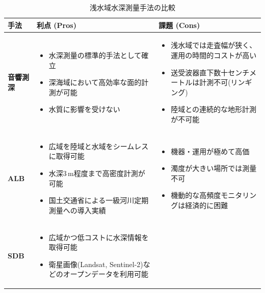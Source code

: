 \begin{table}[htbp]
  \centering
  \small
  \renewcommand{\arraystretch}{1.3}
  \caption{浅水域水深測量手法の比較}
  \label{tab:bathymetry-methods-comparison}
  \begin{tabularx}{\textwidth}{l>{\RaggedRight\arraybackslash}X>{\RaggedRight\arraybackslash}X}
    \toprule
    \textbf{手法} & \textbf{利点 (Pros)} & \textbf{課題 (Cons)} \\
    \midrule
    \textbf{音響測深} & 
    \begin{itemize}[leftmargin=1.2em, nosep, itemsep=0.2em]
      \item 水深測量の標準的手法として確立
      \item 深海域において高効率な面的計測が可能
      \item 水質に影響を受けない
    \end{itemize} &
    \begin{itemize}[leftmargin=1.2em, nosep, itemsep=0.2em]
      \item 浅水域では走査幅が狭く、運用の時間的コストが高い
      \item 送受波器直下数十センチメートルは計測不可(リンギング)
      \item 陸域との連続的な地形計測が不可能
    \end{itemize} \\
    \midrule
    \textbf{ALB} & 
    \begin{itemize}[leftmargin=1.2em, nosep, itemsep=0.2em]
      \item 広域を陸域と水域をシームレスに取得可能
      \item 水深3\,m程度まで高密度計測が可能
      \item 国土交通省による一級河川定期測量への導入実績
    \end{itemize} &
    \begin{itemize}[leftmargin=1.2em, nosep, itemsep=0.2em]
      \item 機器・運用が極めて高価
      \item 濁度が大きい場所では測量不可
      \item 機動的な高頻度モニタリングは経済的に困難
    \end{itemize} \\
    \midrule
    \textbf{SDB} & 
    \begin{itemize}[leftmargin=1.2em, nosep, itemsep=0.2em]
      \item 広域かつ低コストに水深情報を取得可能
      \item 衛星画像(Landsat, Sentinel-2)などのオープンデータを利用可能

\end{itemize}
\end{tabularx}
\end{table}
